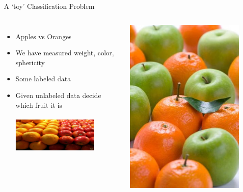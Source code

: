 \documentclass[aspectratio=169, 14pt,usenames,dvipsnames]{beamer}
\begin{document}
\begin{frame}{A ‘toy’ Classification Problem}
\begin{columns}
\begin{itemize}
\item Apples vs Oranges
\item We have measured weight, color, sphericity
\item Some labeled data
\item Given unlabeled data decide which fruit it is\\[10pt]

\centering\includegraphics[width=0.75\textwidth, height=2.7cm]{Images/deeper_look_15.png}
\end{itemize}
\includegraphics[width=0.9\textwidth,height=0.55\textheight]{Images/deeper_look_15a.png}
\end{columns}
\end{frame}
\end{document}
